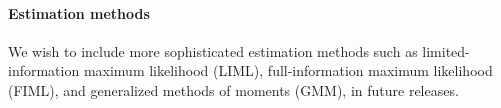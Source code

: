 \paragraph{Estimation methods}
We wish to include more sophisticated estimation methods such
as limited-information maximum likelihood (LIML),
full-information maximum likelihood (FIML),
and generalized methods of moments (GMM), in future releases.





